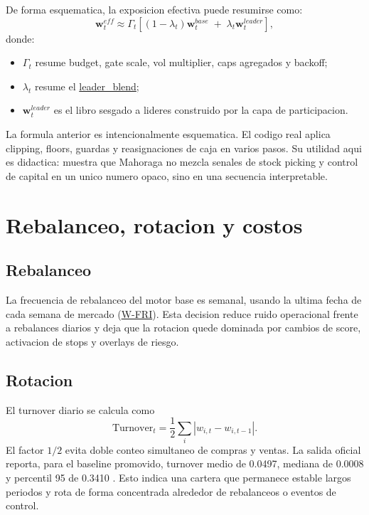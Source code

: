 \documentclass[11pt,letterpaper]{article}
\newcommand{\code}[1]{{\urlstyle{tt}\url{#1}}}
\begin{document}
De forma esquematica, la exposicion efectiva puede resumirse como:
\begin{equation}
\mathbf{w}^{eff}_t
\approx
\Gamma_t
\left[
(1-\lambda_t)\mathbf{w}^{base}_t
\;+\;
\lambda_t \mathbf{w}^{leader}_t
\right],
\end{equation}
donde:
\begin{itemize}
    \item \(\Gamma_t\) resume budget, gate scale, vol multiplier, caps agregados y backoff;
    \item \(\lambda_t\) resume el \code{leader\_blend};
    \item \(\mathbf{w}^{leader}_t\) es el libro sesgado a lideres construido por la capa de participacion.
\end{itemize}

La formula anterior es intencionalmente esquematica. El codigo real aplica clipping, floors, guardas y reasignaciones de caja en varios pasos. Su utilidad aqui es didactica: muestra que Mahoraga no mezcla senales de stock picking y control de capital en un unico numero opaco, sino en una secuencia interpretable.

\section{Rebalanceo, rotacion y costos}
\subsection{Rebalanceo}
La frecuencia de rebalanceo del motor base es semanal, usando la ultima fecha de cada semana de mercado (\code{W-FRI}). Esta decision reduce ruido operacional frente a rebalances diarios y deja que la rotacion quede dominada por cambios de score, activacion de stops y overlays de riesgo.

\subsection{Rotacion}
El turnover diario se calcula como
\begin{equation}
\mathrm{Turnover}_t
= \frac{1}{2}\sum_i \left|w_{i,t} - w_{i,t-1}\right|.
\end{equation}
El factor \(1/2\) evita doble conteo simultaneo de compras y ventas. La salida oficial reporta, para el baseline promovido, turnover medio de 0.0497, mediana de 0.0008 y percentil 95 de 0.3410 \citep{quantOfficialOutputs2026}. Esto indica una cartera que permanece estable largos periodos y rota de forma concentrada alrededor de rebalanceos o eventos de control.
\end{document}
